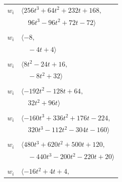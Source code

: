 \documentclass[11pt]{article}
\begin{document}
\begin{longtable}{@{}ll@{}}
$w_i$ & $\langle 256t^{3}+64t^{2}+232t+168,$\\
 & $\quad 96t^{3}-96t^{2}+72t-72\rangle$\\
\addlinespace[2pt]
\multicolumn{2}{@{}p{0.97\textwidth}@{}}{$i=6$, $D_i=1$, $e_i=3$, $\rho_{ij}$: $13{:}1, \allowbreak 16{:}3, \allowbreak 17{:}1, \allowbreak 23{:}2, \allowbreak 24{:}3, \allowbreak 26{:}3$}\\
$w_i$ & $\langle -8,$\\
 & $\quad -4t+4\rangle$\\
\addlinespace[2pt]
\multicolumn{2}{@{}p{0.97\textwidth}@{}}{$i=7$, $D_i=2$, $e_i=1$, $\rho_{ij}$: $16{:}1, \allowbreak 20{:}3, \allowbreak 27{:}3, \allowbreak 31{:}1, \allowbreak 36{:}3$}\\
$w_i$ & $\langle 8t^{2}-24t+16,$\\
 & $\quad -8t^{2}+32\rangle$\\
\addlinespace[2pt]
\multicolumn{2}{@{}p{0.97\textwidth}@{}}{$i=8$, $D_i=4$, $e_i=2$, $\rho_{ij}$: $3{:}3, \allowbreak 10{:}3, \allowbreak 17{:}1, \allowbreak 21{:}1, \allowbreak 24{:}1, \allowbreak 28{:}3, \allowbreak 33{:}3, \allowbreak 37{:}1, \allowbreak 38{:}2$}\\
$w_i$ & $\langle -192t^{2}-128t+64,$\\
 & $\quad 32t^{2}+96t\rangle$\\
\addlinespace[2pt]
\multicolumn{2}{@{}p{0.97\textwidth}@{}}{$i=9$, $D_i=2$, $e_i=3$, $\rho_{ij}$: $3{:}3, \allowbreak 19{:}3, \allowbreak 21{:}3, \allowbreak 22{:}1, \allowbreak 23{:}1, \allowbreak 25{:}3, \allowbreak 31{:}3, \allowbreak 33{:}1, \allowbreak 39{:}3$}\\
$w_i$ & $\langle -160t^{3}+336t^{2}+176t-224,$\\
 & $\quad 320t^{3}-112t^{2}-304t-160\rangle$\\
\addlinespace[2pt]
\multicolumn{2}{@{}p{0.97\textwidth}@{}}{$i=10$, $D_i=52$, $\rho_{ij}$: $1{:}2, \allowbreak 3{:}2, \allowbreak 4{:}1, \allowbreak 8{:}1, \allowbreak 24{:}3, \allowbreak 25{:}1, \allowbreak 31{:}1, \allowbreak 35{:}2, \allowbreak 39{:}2$}\\
$w_i$ & $\langle 480t^{3}+620t^{2}+500t+120,$\\
 & $\quad -440t^{3}-200t^{2}-220t+20\rangle$\\
\addlinespace[2pt]
\multicolumn{2}{@{}p{0.97\textwidth}@{}}{$i=11$, $D_i=1$, $\rho_{ij}$: $23{:}3, \allowbreak 30{:}2, \allowbreak 31{:}3, \allowbreak 42{:}3$}\\
$w_i$ & $\langle -16t^{2}+4t+4,$\\

\end{longtable}
\end{document}
